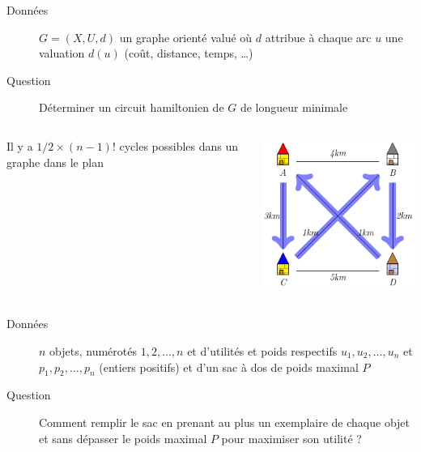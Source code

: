 \documentclass[aspectratio=1610,francais,envcountsect]{beamer}
\begin{document}
\begin{frame}[allowframebreaks]
  \begin{definition}

    \begin{description}
    \item [Données] $G = (X, U, d)$ un graphe orienté valué où $d$
      attribue à chaque arc $u$ une valuation $d(u)$ (coût, distance,
      temps, \ldots)
    \item [Question] Déterminer un circuit hamiltonien de $G$ de
      longueur minimale
    \end{description}
  \end{definition}

  \begin{columns}
    \begin{column}{0.5\columnwidth}
      \begin{theorem}
        Il y a $1/2 \times (n - 1)!$ cycles possibles dans un graphe
        dans le plan
      \end{theorem}
    \end{column}

    \begin{column}{0.5\columnwidth}
      \begin{center}
        \includegraphics[width=0.7\columnwidth]{tsp.png}
      \end{center}
    \end{column}
  \end{columns}


  \framebreak

  \begin{definition}

    \begin{description}
    \item [Données] $n$ objets, numérotés $1, 2, \ldots, n$ et
      d’utilités et poids respectifs $u_1, u_2, \ldots , u_n$ et
      $p_1, p_2, \ldots , p_n$ (entiers positifs) et d’un sac à dos de
      poids maximal $P$
    \item [Question] Comment remplir le sac en prenant au plus un
      exemplaire de chaque objet et sans dépasser le poids maximal $P$
      pour maximiser son utilité ?
    \end{description}
  \end{definition}


\end{frame}
\end{document}
